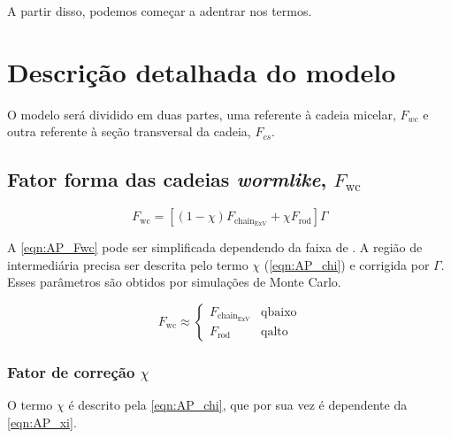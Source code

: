 \begin{apendicesenv}
A partir disso, podemos começar a adentrar nos termos.

\section{Descrição detalhada do modelo}

O modelo será dividido em duas partes, uma referente à cadeia micelar, \(F_{wc}\) e outra referente à seção transversal da cadeia, \(F_{cs}\).

\subsection{Fator forma das cadeias \emph{wormlike}, \(F_{\mathrm{wc}}\)}
\label{sec:equacoes_Fwc}

\begin{equation}
F_{\mathrm{wc}} = \left[\left(1 - \chi\right)F_{\mathrm{chain}_{\mathrm{ExV}}} + \chi F_{\mathrm{rod}}\right]\Gamma
\label{eqn:AP_Fwc}
\end{equation}

A \autoref{eqn:AP_Fwc} pode ser simplificada dependendo da faixa de \q. A região de \q intermediária precisa ser descrita pelo termo \(\chi\) (\autoref{eqn:AP_chi}) e corrigida por \(\Gamma\). Esses parâmetros são obtidos por simulações de Monte Carlo.

\begin{equation}
	F_\mathrm{wc} \approx 
		\begin{cases}
			F_{\mathrm{chain}_\mathrm{ExV}}		& \mathrm{q baixo}  \\
			F_\mathrm{rod}						& \mathrm{q alto}
		\end{cases}
	\label{eqn:AP_Fwc_dois_casos}
\end{equation}


\subsubsection{Fator de correção \(\chi\)}
O termo \(\chi\) é descrito pela \autoref{eqn:AP_chi}, que por sua vez é dependente da \autoref{eqn:AP_xi}.


\end{apendicesenv}
